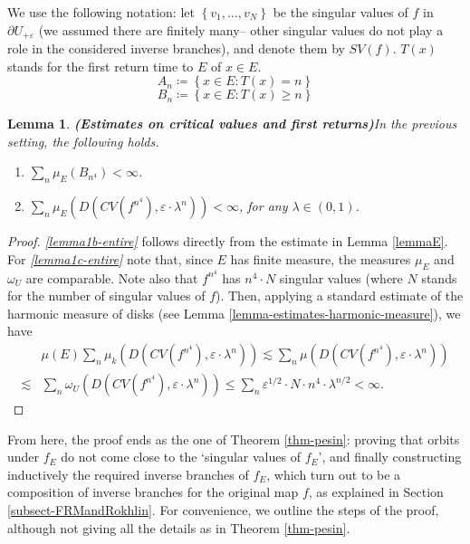 \documentclass[11pt]{article}
\newtheorem{sublemma}[claim]{Lemma}
\theoremstyle{definition}
\theoremstyle{remark}
\theoremstyle{plain}
\begin{document}
We use the following notation: let $ \left\lbrace v_1, \dots, v_N\right\rbrace  $ be the singular values of $ f $ in $\partial U_{+\varepsilon}$ (we assumed there are finitely many-- other singular values do not play a role in the considered inverse branches), and denote them by $ SV(f) $. $ T(x) $ stands for the first return time to $ E $ of $ x\in E $. 
\[A_n\coloneqq \left\lbrace x\in E\colon T(x)=n \right\rbrace \]
\[B_n \coloneqq \left\lbrace x\in E\colon T(x)\geq n \right\rbrace\]
\begin{sublemma}{\bf (Estimates on critical values and first returns)}\label{lemma-SV-f_A} In the previous setting, the following holds.
\begin{enumerate}[label={\em (2.\arabic*)}]
		\item\label{lemma1b-entire} $ \sum\limits_{n} \mu_E(B_{n^4})<\infty $.
	\item\label{lemma1c-entire} $ \sum_n \mu_E(D(CV(f^{n^4}), \varepsilon\cdot \lambda^n)) <\infty$, for any $ \lambda\in (0,1) $.
\end{enumerate}
\end{sublemma}
\begin{proof}
{\em \ref{lemma1b-entire}} follows directly from the estimate in Lemma \ref{lemmaE}.
	For {\em \ref{lemma1c-entire}}  note that, since $ E $ has finite measure, the measures $ \mu_E $ and $ \omega_U $ are comparable. Note also that $ f^{n^4} $ has $ n^4\cdot N $ singular values (where $ N $ stands for the number of singular values of $ f $). Then, applying a standard estimate of the harmonic measure of disks (see Lemma \ref{lemma-estimates-harmonic-measure}), we have
	\begin{align*}
		&\mu(E)\sum_n \mu_k(D(CV(f^{n^4}),\varepsilon \cdot \lambda^n))\lesssim\sum_n \mu (D(CV(f^{n^4}), \varepsilon\cdot \lambda^n))\\
		\lesssim&\sum_n \omega_U(D(CV(f^{n^4}), \varepsilon\cdot \lambda^n)) \leq  \sum_n \varepsilon^{1/2}\cdot  N\cdot n^4\cdot \lambda ^{n/2} <\infty.
	\end{align*}
\end{proof}

From here, the proof ends as the one of Theorem \ref{thm-pesin}:  proving that orbits under $ f_{E} $ do not come close to the `singular values of $ f_{E}$', and finally constructing inductively the required inverse branches of $ f_{E}$, which turn out to be a composition of inverse branches for the original map $ f $, as explained in Section \ref{subsect-FRMandRokhlin}. For convenience, we outline the steps of the proof, although not giving all the details as in Theorem \ref{thm-pesin}. 
\end{document}
